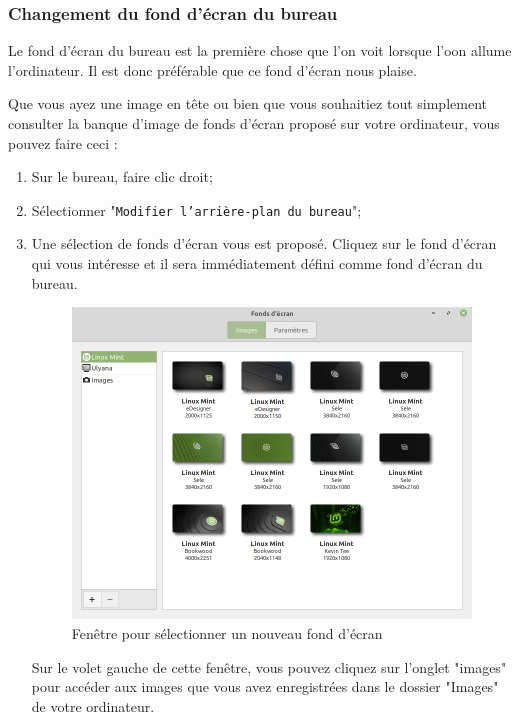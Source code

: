 \documentclass[12pt]{book}
\begin{document}
		\subsubsection{Changement du fond d'écran du bureau}
			Le fond d'écran du bureau est la première chose que l'on voit lorsque l'oon allume l'ordinateur.
			Il est donc préférable que ce fond d'écran nous plaise.\par
			Que vous ayez une image en tête ou bien que vous souhaitiez tout simplement consulter la banque d'image de fonds d'écran proposé sur votre ordinateur, vous pouvez faire ceci :
			\begin{enumerate}
				\item Sur le bureau, faire clic droit;
				\item Sélectionner "\texttt{Modifier l'arrière-plan du bureau}";
				\item Une sélection de fonds d'écran vous est proposé. Cliquez sur le fond d'écran qui vous intéresse et il sera immédiatement défini comme fond d'écran du bureau.
				\begin{figure}[h]
					\centering
					\includegraphics[width=\textwidth]{include/fondsdecran.png}
					\caption{Fenêtre pour sélectionner un nouveau fond d'écran}
					\label{fig:fondsdecran}
				\end{figure}\newline
				Sur le volet gauche de cette fenêtre, vous pouvez cliquez sur l'onglet "images" pour accéder aux images que vous avez enregistrées dans le dossier "Images" de votre ordinateur.
			\end{enumerate}
\end{document}
